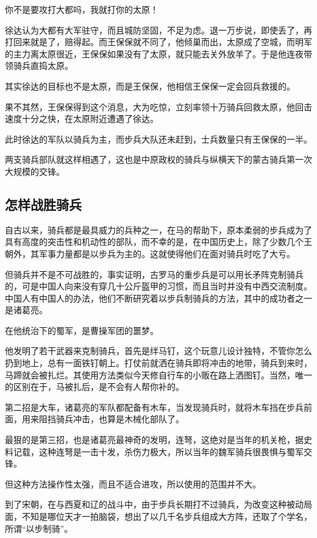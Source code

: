 \begin{multicols}{\theparacolNo}
		你不是要攻打大都吗，我就打你的太原！

		徐达认为大都有大军驻守，而且城防坚固，不足为虑。退一万步说，即使丢了，再打回来就是了，赔得起。而王保保就不同了，他倾巢而出，太原成了空城，而明军的主力离太原很近，王保保如果没有了太原，就只能去关外放羊了。于是他连夜带领骑兵直捣太原。

		其实徐达的目标也不是太原，而是王保保，他相信王保保一定会回兵救援的。

		果不其然，王保保得到这个消息，大为吃惊，立刻率领十万骑兵回救太原，他回击速度十分之快，在太原附近遭遇了徐达。

		此时徐达的军队以骑兵为主，而步兵大队还未赶到，士兵数量只有王保保的一半。

		两支骑兵部队就这样相遇了，这也是中原政权的骑兵与纵横天下的蒙古骑兵第一次大规模的交锋。

		\subsection{怎样战胜骑兵}
		自古以来，骑兵都是最具威力的兵种之一，在马的帮助下，原本柔弱的步兵成为了具有高度的突击性和机动性的部队，而不幸的是，在中国历史上，除了少数几个王朝外，其军事力量都是以步兵为主的。这就使得他们在面对骑兵时吃了大亏。

		但骑兵并不是不可战胜的，事实证明，古罗马的重步兵是可以用长矛阵克制骑兵的，可是中国人向来没有穿几十公斤盔甲的习惯，而且当时并没有中西交流制度。中国人有中国人的办法，他们不断研究着以步兵制骑兵的方法，其中的成功者之一是诸葛亮。

		在他统治下的蜀军，是曹操军团的噩梦。

		他发明了若干武器来克制骑兵，首先是绊马钉，这个玩意儿设计独特，不管你怎么扔到地上，总有一面铁钉朝上。打仗前就洒在骑兵即将冲击的地带，骑兵到来时，马蹄就会被扎烂。其使用方法类似今天修自行车的小贩在路上洒图钉。当然，唯一的区别在于，马被扎后，是不会有人帮你补的。

		第二招是大车，诸葛亮的军队都配备有木车，当发现骑兵时，就将木车挡在步兵前面，用来阻挡骑兵冲击，也算是木械化部队了。

		最狠的是第三招，也是诸葛亮最神奇的发明，连弩，这绝对是当年的机关枪，据史料记载，这种连弩是一击十发，杀伤力极大，所以当年的魏军骑兵很畏惧与蜀军交锋。

		但这种方法操作性太强，而且不适合进攻，所以使用的范围并不大。

		到了宋朝，在与西夏和辽的战斗中，由于步兵长期打不过骑兵，为改变这种被动局面，不知是哪位天才一拍脑袋，想出了以几千名步兵组成大方阵，还取了个学名，所谓“以步制骑”。


\end{multicols}
